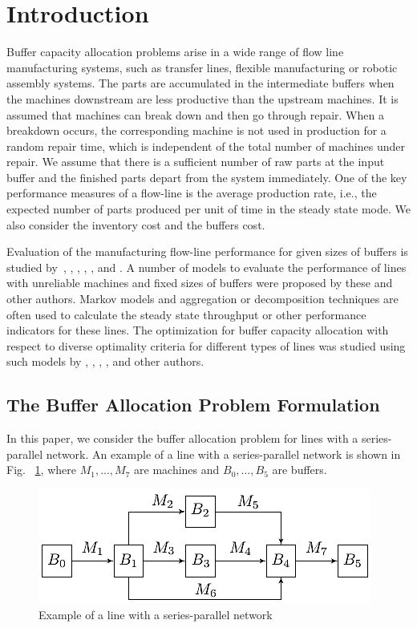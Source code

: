 \documentclass{ifacconf}
\begin{document}
\section{Introduction}

Buffer  capacity  allocation  problems  arise  in  a  wide  range  of  flow line manufacturing  systems, 
such  as  transfer  lines,  flexible  manufacturing  or  robotic  assembly  systems. 
The parts are accumulated in the intermediate buffers when the machines downstream are less productive than the upstream machines. 
It is assumed that machines can break down and then go through repair. When a breakdown occurs, the corresponding 
machine is not used in production for a random repair time, which  is independent of the total 
number of machines under repair. We assume  that there is a sufficient number of raw parts at 
the input buffer and the finished parts depart 
from the system immediately. One of the key performance measures of a flow-line is 
the average production rate, i.e., the expected number of parts produced per 
unit of time in the steady state mode. We also consider the inventory cost and the buffers cost.

Evaluation  of the manufacturing flow-line performance for given sizes of buffers is studied 
by~\cite{Proth84}, \cite{DG92}, \cite{Gershwin1993}, \cite{HPB1993}, \cite{Meerkov2009}, and \cite{TanGer09}. A number of
 models to evaluate the performance of lines with unreliable machines and fixed sizes of buffers were proposed by these and other authors. 
Markov models and aggregation or decomposition techniques are often used to calculate the
steady state throughput or other performance indicators for these lines.  
The  optimization  for  buffer  capacity  allocation with 
respect to diverse optimality criteria for different types of lines was studied 
using such models by \cite{SmiDas88}, \cite{So97}, \cite{GS}, \cite{Khelil_21}, \cite{ShiGer2009} and other authors. 

\subsection{The Buffer Allocation Problem Formulation} \label{bap_formulation}

In this paper, we consider the buffer allocation problem for lines with a series-parallel network. 
An example of a line with a series-parallel network is shown in Fig. ~\ref{lineexample}, where $M_1,…,M_7$ are machines and $B_0,…,B_5$ are buffers.

 \begin{figure}[h!]
	\centering
	\includegraphics[scale=0.7]{LineSchems}
  \caption{Example of a line with a series-parallel network\label{lineexample}}
  \end{figure}
\end{document}
